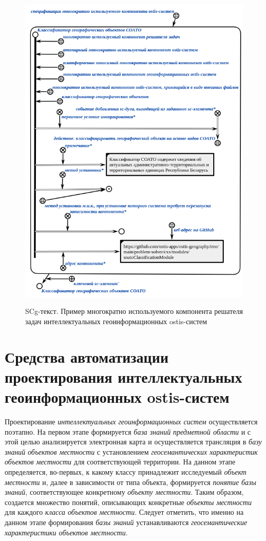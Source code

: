 \begin{figure}[H]
	\caption{SCg-текст. Пример многократно используемого компонента решателя задач интеллектуальных геоинформационных ostis-систем}
	\includegraphics[scale=0.8]{author/part7/figures/gis_ps_component.png}
	\label{fig:gis_ps_component}
\end{figure}

\section{Средства автоматизации проектирования интеллектуальных геоинформационных ostis-систем}
\label{chapter_gis_sec_automatization}

Проектирование \textit{интеллектуальных геоинформационных систем} осуществляется поэтапно. На первом этапе формируется \textit{база знаний} \textit{предметной области} и с этой целью анализируется электронная карта и осуществляется трансляция в \textit{базу знаний} \textit{объектов местности} с установлением \textit{геосемантических характеристик объектов местности} для соответствующей территории. На данном этапе определяется, во-первых, к какому классу принадлежит исследуемый \textit{объект местности} и, далее в зависимости от типа объекта, формируется \textit{понятие} \textit{базы знаний}, соответствующее конкретному \textit{объекту местности}. Таким образом, создается множество понятий, описывающих конкретные \textit{объекты местности} для каждого \textit{класса объектов местности\scnsupergroupsign}. Следует отметить, что именно на данном этапе формирования \textit{базы знаний} устанавливаются \textit{геосемантические характеристики объектов местности}.

